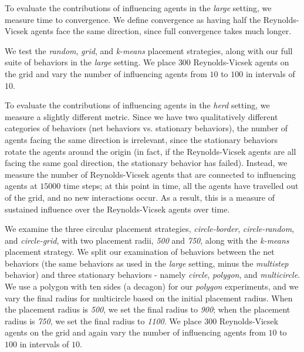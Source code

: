 To evaluate the contributions of influencing agents in the \textit{large}
setting, we measure time to convergence.
We define convergence as having half the Reynolds-Vicsek agents face the same
direction, since full convergence takes much longer.

We test the \textit{random}, \textit{grid}, and \textit{k-means} placement
strategies, along with our full suite of behaviors in the \textit{large}
setting.
We place $300$ Reynolds-Vicsek agents on the grid and vary
the number of influencing agents from $10$ to $100$ in intervals of $10$.

To evaluate the contributions of influencing agents in the \textit{herd}
setting, we measure a slightly different metric.
Since we have two qualitatively different categories of behaviors (net
behaviors vs. stationary behaviors), the number of agents facing the same
direction is irrelevant, since the stationary behaviors rotate the agents around
the origin (in fact, if the Reynolds-Vicsek agents are all facing the same
goal direction, the stationary behavior has failed).
Instead, we measure the number of Reynolds-Vicsek agents that are connected to
influencing agents at $15000$ time steps; at this point in time, all the agents
have travelled out of the grid, and no new interactions occur.
As a result, this is a measure of sustained influence over the Reynolds-Vicsek
agents over time.

We examine the three circular placement strategies, \textit{circle-border},
\textit{circle-random}, and \textit{circle-grid}, with two placement radii,
\textit{500} and \textit{750}, along with the \textit{k-means} placement
strategy.
We split our examination of behaviors between the net behaviors
(the same behaviors as used in the \textit{large} setting, minus the
\textit{multistep} behavior) and three stationary behaviors - namely
\textit{circle}, \textit{polygon}, and \textit{multicircle}.
We use a polygon with ten sides (a decagon) for our \textit{polygon}
experiments, and we vary the final radius for multicircle based on the initial
placement radius.
When the placement radius is \textit{500}, we set the final radius to
\textit{900}; when the placement radius is \textit{750}, we set the final
radius to \textit{1100}.
We place $300$ Reynolds-Vicsek agents on the grid and again vary the number of
influencing agents from $10$ to $100$ in intervals of $10$.

